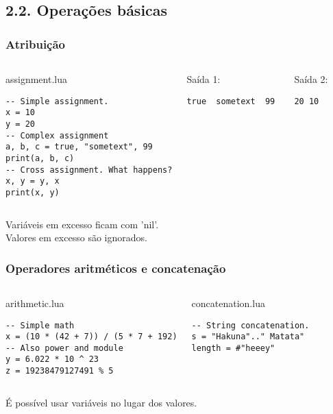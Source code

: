 \documentclass[brazil]{beamer}
\begin{document}
\subsection{2.2. Operações básicas}
\begin{frame}[fragile]
  \frametitle{Atribuição}
  \pause
  \begin{columns}
      \begin{block}{assignment.lua}
        \begin{lstlisting}
-- Simple assignment.
x = 10
y = 20
-- Complex assignment
a, b, c = true, "sometext", 99
print(a, b, c)
-- Cross assignment. What happens?
x, y = y, x
print(x, y)
        \end{lstlisting}
      \end{block}
    \pause
      \begin{block}{Saída 1:}
        \begin{verbatim}
true  sometext  99 \end{verbatim}
      \end{block}
      \pause
      \begin{block}{Saída 2:}
        \begin{verbatim}
20 10 \end{verbatim}
      \end{block}
  \end{columns}
  \pause
  \begin{center}
    Variáveis em excesso ficam com 'nil'. \\
    Valores em excesso são ignorados.
  \end{center}
\end{frame}
\begin{frame}[fragile]
  \frametitle{Operadores aritméticos e concatenação}
  \pause
  \begin{columns}
      \begin{block}{arithmetic.lua}
        \begin{lstlisting}
-- Simple math
x = (10 * (42 + 7)) / (5 * 7 + 192)
-- Also power and module
y = 6.022 * 10 ^ 23
z = 19238479127491 % 5
        \end{lstlisting}
      \end{block}
    \pause
      \begin{block}{concatenation.lua}
        \begin{lstlisting}
-- String concatenation.
s = "Hakuna".." Matata"
length = #"heeey"
        \end{lstlisting}
      \end{block}
  \end{columns}
  \pause
  \begin{center}
    É possível usar variáveis no lugar dos valores.
  \end{center}
\end{frame}
\end{document}

